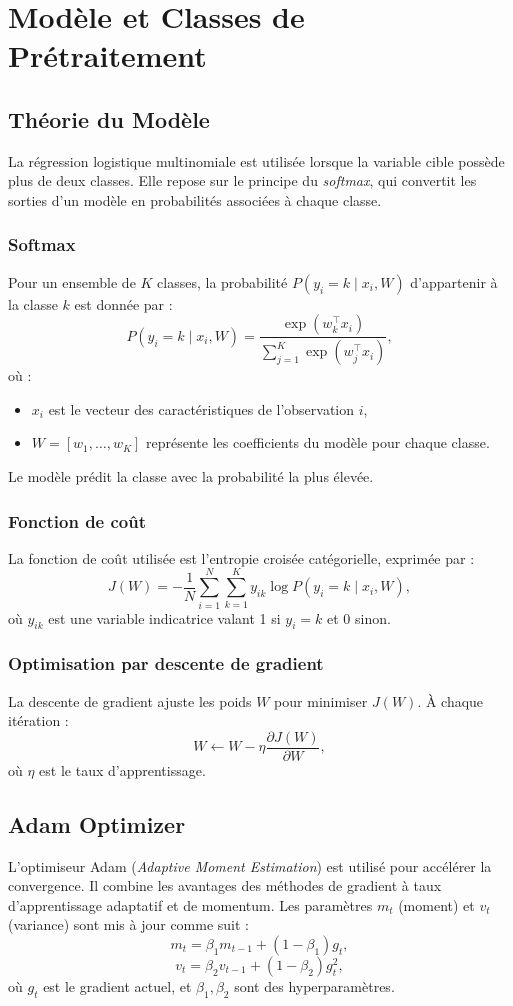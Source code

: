 \documentclass[a4paper,12pt]{article}
\begin{document}
\section{Modèle et Classes de Prétraitement}

\subsection{Théorie du Modèle}
La régression logistique multinomiale est utilisée lorsque la variable cible possède plus de deux classes. Elle repose sur le principe du \textit{softmax}, qui convertit les sorties d’un modèle en probabilités associées à chaque classe.

\subsubsection{Softmax}
Pour un ensemble de \( K \) classes, la probabilité \( P(y_i = k \mid x_i, W) \) d’appartenir à la classe \( k \) est donnée par :
\[
P(y_i = k \mid x_i, W) = \frac{\exp(w_k^\top x_i)}{\sum_{j=1}^K \exp(w_j^\top x_i)},
\]
où :
\begin{itemize}
    \item \( x_i \) est le vecteur des caractéristiques de l’observation \( i \),
    \item \( W = [w_1, \dots, w_K] \) représente les coefficients du modèle pour chaque classe.
\end{itemize}
Le modèle prédit la classe avec la probabilité la plus élevée.

\subsubsection{Fonction de coût}
La fonction de coût utilisée est l'entropie croisée catégorielle, exprimée par :
\[
J(W) = -\frac{1}{N} \sum_{i=1}^N \sum_{k=1}^K y_{ik} \log P(y_i = k \mid x_i, W),
\]
où \( y_{ik} \) est une variable indicatrice valant 1 si \( y_i = k \) et 0 sinon.

\subsubsection{Optimisation par descente de gradient}
La descente de gradient ajuste les poids \( W \) pour minimiser \( J(W) \). À chaque itération :
\[
W \leftarrow W - \eta \frac{\partial J(W)}{\partial W},
\]
où \( \eta \) est le taux d’apprentissage.

\subsection{Adam Optimizer}
L’optimiseur Adam (\textit{Adaptive Moment Estimation}) est utilisé pour accélérer la convergence. Il combine les avantages des méthodes de gradient à taux d'apprentissage adaptatif et de momentum. Les paramètres \( m_t \) (moment) et \( v_t \) (variance) sont mis à jour comme suit :
\[
m_t = \beta_1 m_{t-1} + (1 - \beta_1) g_t,
\]
\[
v_t = \beta_2 v_{t-1} + (1 - \beta_2) g_t^2,
\]
où \( g_t \) est le gradient actuel, et \( \beta_1, \beta_2 \) sont des hyperparamètres.
\end{document}
